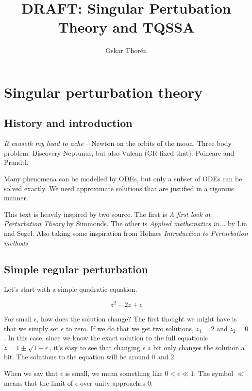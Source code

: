 \documentclass[12pt]{report}
\begin{document}


\title{DRAFT: Singular Pertubation Theory and TQSSA}
\author{Oskar Thor\'{e}n}

\maketitle

\chapter{Singular perturbation theory}

\section{History and introduction}

\textit{It causeth my head to ache} -- Newton on the orbits of the moon. Three
body problem. Discovery Neptunus, but also Vulcan (GR fixed that). Poincare and Prandtl.

Many phenomena can be modelled by ODEs, but only a subset of ODEs can be solved
exactly. We need approximate solutions that are justified in a rigorous manner.

This text is heavily inspired by two source. The first is \textit{A first look
at Perturbation Theory} by Simmonds. The other is \textit{Applied mathematics
in...} by Lin and Segel. Also taking some inspiration from Holmes
\textit{Introduction to Perturbation methods}

\section{Simple regular perturbation}

Let's start with a simple quadratic equation.

\begin{equation}
  z^2 - 2z + \epsilon
\end{equation}


For small $\epsilon$, how does the solution change? The first thought we might
have is that we simply set $\epsilon$ to zero. If we do that we get two
solutions, $z_1 = 2$ and $z_2 = 0$. In this case, since we know the exact
solution to the full equationis $z = 1 \pm \sqrt{1-\epsilon}$, it's easy to see
that changing $\epsilon$ a bit only changes the solution a bit. The solutions to
the equation will be around $0$ and $2$.

When we say that $\epsilon$ is small, we mean something like $0 < \epsilon
\ll 1$. The symbol $\ll$ means that the limit of $\epsilon$ over unity
approaches $0$.
\end{document}
